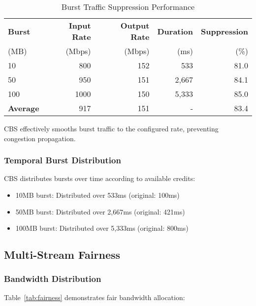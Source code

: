 \documentclass[10pt, journal, compsoc]{IEEEtran}
\begin{document}
\begin{table}[h]
\centering
\caption{Burst Traffic Suppression Performance}
\label{tab:burst_suppression}
\begin{tabular}{lrrrr}
\toprule
\textbf{Burst} & \textbf{Input Rate} & \textbf{Output Rate} & \textbf{Duration} & \textbf{Suppression} \\
(MB) & (Mbps) & (Mbps) & (ms) & (\%) \\
\midrule
10 & 800 & 152 & 533 & 81.0 \\
50 & 950 & 151 & 2,667 & 84.1 \\
100 & 1000 & 150 & 5,333 & 85.0 \\
\midrule
\textbf{Average} & 917 & 151 & - & 83.4 \\
\bottomrule
\end{tabular}
\end{table}

CBS effectively smooths burst traffic to the configured rate, preventing congestion propagation.

\subsubsection{Temporal Burst Distribution}

CBS distributes bursts over time according to available credits:

\begin{itemize}
    \item 10MB burst: Distributed over 533ms (original: 100ms)
    \item 50MB burst: Distributed over 2,667ms (original: 421ms)
    \item 100MB burst: Distributed over 5,333ms (original: 800ms)
\end{itemize}

\subsection{Multi-Stream Fairness}

\subsubsection{Bandwidth Distribution}

Table~\ref{tab:fairness} demonstrates fair bandwidth allocation:
\end{document}
